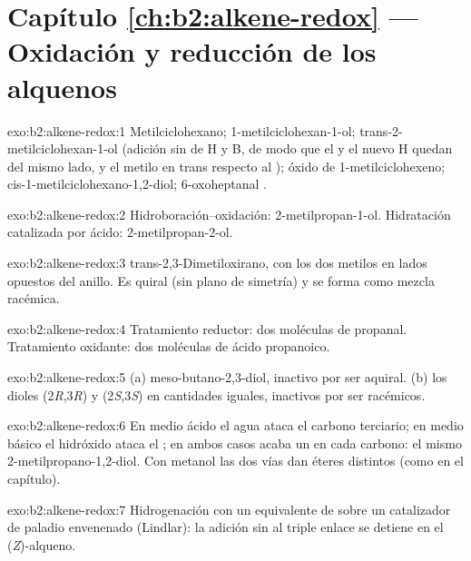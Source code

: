 \section*{Capítulo \ref{ch:b2:alkene-redox} --- Oxidación y reducción de los alquenos}

\begin{solution}{exo:b2:alkene-redox:1}
Metilciclohexano; 1-metilciclohexan-1-ol; trans-2-metilciclohexan-1-ol (adición sin de
H y B, de modo que el  y el nuevo H quedan del mismo lado, y el metilo en trans respecto al );
óxido de 1-metilciclohexeno; cis-1-metilciclohexano-1,2-diol; 6-oxoheptanal
.
\end{solution}

\begin{solution}{exo:b2:alkene-redox:2}
Hidroboración--oxidación: 2-metilpropan-1-ol. Hidratación catalizada por ácido:
2-metilpropan-2-ol.
\end{solution}

\begin{solution}{exo:b2:alkene-redox:3}
trans-2,3-Dimetiloxirano, con los dos metilos en lados opuestos del anillo. Es quiral (sin
plano de simetría) y se forma como mezcla racémica.
\end{solution}

\begin{solution}{exo:b2:alkene-redox:4}
Tratamiento reductor: dos moléculas de propanal. Tratamiento oxidante: dos moléculas de ácido
propanoico.
\end{solution}

\begin{solution}{exo:b2:alkene-redox:5}
(a) meso-butano-2,3-diol, inactivo por ser aquiral. (b) los dioles
(2\textit{R},3\textit{R}) y (2\textit{S},3\textit{S}) en cantidades iguales, inactivos
por ser racémicos.
\end{solution}

\begin{solution}{exo:b2:alkene-redox:6}
En medio ácido el agua ataca el carbono terciario; en medio básico el hidróxido ataca el ; en ambos
casos acaba un  en cada carbono: el mismo 2-metilpropano-1,2-diol. Con metanol las dos
vías dan éteres distintos (como en el capítulo).
\end{solution}

\begin{solution}{exo:b2:alkene-redox:7}
Hidrogenación con un equivalente de  sobre un catalizador de paladio envenenado
(Lindlar): la adición sin al triple enlace se detiene en el (\textit{Z})-alqueno.
\end{solution}

